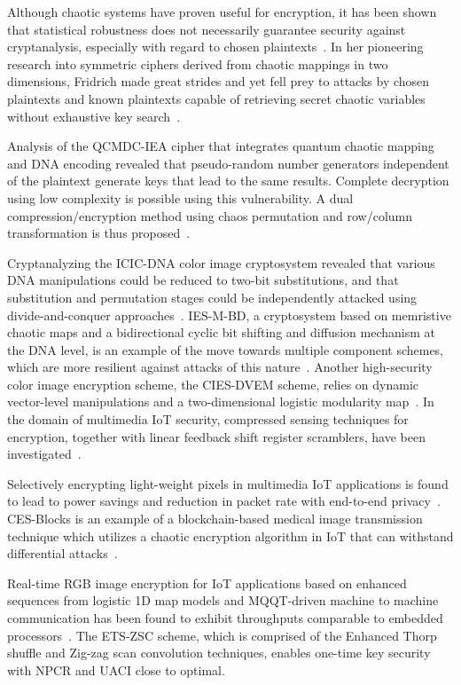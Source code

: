 Although chaotic systems have proven useful for encryption,
it has been shown that statistical robustness does not
necessarily guarantee security against cryptanalysis, especially
with regard to chosen plaintexts~\cite{xie2017cryptanalysis}.
In her pioneering research into symmetric ciphers derived from
chaotic mappings in two dimensions, Fridrich made great strides
and yet fell prey to attacks by chosen plaintexts and known
plaintexts capable of retrieving secret chaotic variables without
exhaustive key search~\cite{fridrich1998symmetric}.

Analysis of the QCMDC-IEA cipher that integrates quantum chaotic mapping and DNA encoding revealed that pseudo-random number generators independent of the plaintext generate keys that lead to the same results. Complete decryption using low complexity is possible using this vulnerability. A dual compression/encryption method using chaos permutation and row/column transformation is thus proposed~\cite{wen2023compression}.

Cryptanalyzing the ICIC-DNA color image cryptosystem revealed that
various DNA manipulations could be reduced to two-bit substitutions,
and that substitution and permutation stages could be independently
attacked using divide-and-conquer approaches~\cite{wen2023icicdna}.
IES-M-BD, a cryptosystem based on memristive chaotic maps and a
bidirectional cyclic bit shifting and diffusion mechanism at the DNA
level, is an example of the move towards multiple component schemes,
which are more resilient against attacks of this nature~\cite{qian2022iesmbd}.
Another high-security color image encryption scheme, the CIES-DVEM scheme, relies
on dynamic vector-level manipulations and a two-dimensional logistic modularity map~\cite{li2023ciesdvem}.
In the domain of multimedia IoT security, compressed sensing techniques
for encryption, together with linear feedback shift register scramblers,
have been investigated~\cite{choi2022cs}.

Selectively encrypting light-weight pixels in multimedia IoT 
applications is found to lead to power savings and reduction 
in packet rate with end-to-end privacy~\cite{hedayati2022lightweight}.
CES-Blocks is an example of a blockchain-based medical image 
transmission technique which utilizes a chaotic encryption 
algorithm in IoT that can withstand differential attacks~\cite{durga2022cesblocks}.

Real-time RGB image encryption for IoT applications based on enhanced sequences
from logistic 1D map models and MQQT-driven machine to machine communication
has been found to exhibit throughputs comparable to embedded processors~\cite{trujillo2021realtime}.
The ETS-ZSC scheme, which is comprised of the Enhanced Thorp shuffle and Zig-zag scan
convolution techniques, enables one-time key security with NPCR and UACI close to optimal.


